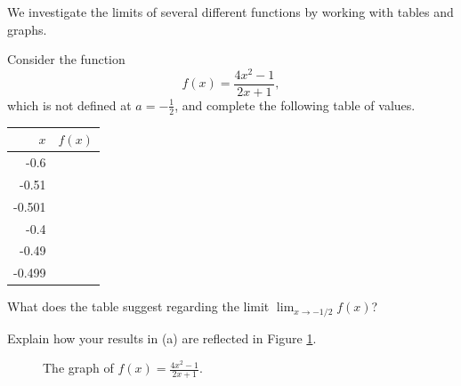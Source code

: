 \begin{pa} \label{PA:10.1} 
We investigate the limits of several different functions by working with tables and graphs.
\ba
\item Consider the function 
  $$
  f(x) = \frac{4x^2 - 1}{2x+1},
  $$
  which is not defined at $a = -\frac{1}{2}$, and complete the following table of values.
  \begin{center}
    \begin{tabular}{|r|c|}
      \hline      
      $x$ & $f(x)$ \\
      \hline
      \hline
      -0.6 & \hspace*{1in} \\
      \hline
      -0.51 & \hspace*{1in} \\
      \hline
      -0.501 & \hspace*{1in} \\
      \hline
      -0.4 & \hspace*{1in} \\
      \hline
      -0.49 & \hspace*{1in} \\
      \hline
      -0.499 & \hspace*{1in} \\
      \hline
    \end{tabular}
  \end{center}
  What does the table suggest regarding the limit $\lim_{x\to -1/2}f(x)$?

\item Explain how your results in (a) are reflected in Figure
  \ref{F:10.1.activity.1}. 

  \begin{figure}[ht]
    \begin{center}
      \caption{The graph of $f(x) = \frac{4x^2 - 1}{2x+1}$.}
      \label{F:10.1.activity.1}
    \end{center}
  \end{figure}
      

\end{pa}
